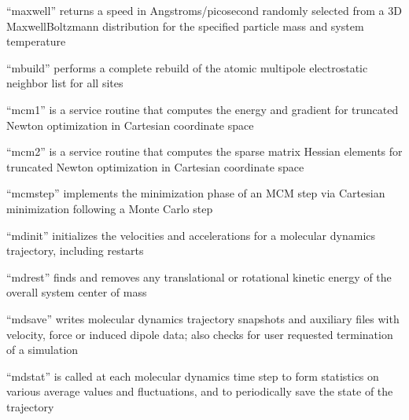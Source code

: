 \documentclass[letterpaper,11pt,english]{sphinxmanual}
\begin{document}

“maxwell” returns a speed in Angstroms/picosecond randomly
selected from a 3\sphinxhyphen{}D Maxwell\sphinxhyphen{}Boltzmann distribution for the
specified particle mass and system temperature


“mbuild” performs a complete rebuild of the atomic multipole
electrostatic neighbor list for all sites


“mcm1” is a service routine that computes the energy and
gradient for truncated Newton optimization in Cartesian
coordinate space


“mcm2” is a service routine that computes the sparse matrix
Hessian elements for truncated Newton optimization in Cartesian
coordinate space


“mcmstep” implements the minimization phase of an MCM step
via Cartesian minimization following a Monte Carlo step


“mdinit” initializes the velocities and accelerations
for a molecular dynamics trajectory, including restarts


“mdrest” finds and removes any translational or rotational
kinetic energy of the overall system center of mass


“mdsave” writes molecular dynamics trajectory snapshots and
auxiliary files with velocity, force or induced dipole data;
also checks for user requested termination of a simulation


“mdstat” is called at each molecular dynamics time step to
form statistics on various average values and fluctuations,
and to periodically save the state of the trajectory




\end{document}

